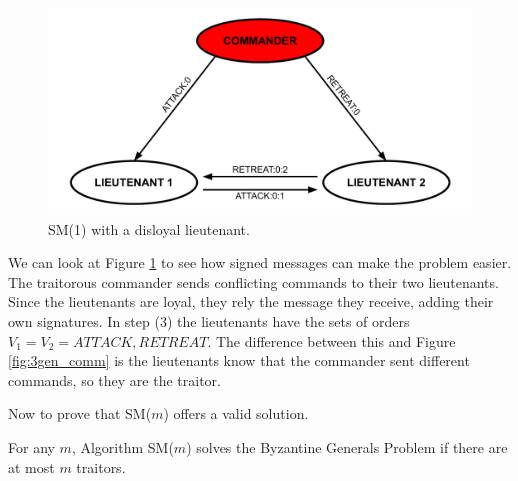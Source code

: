 \documentclass[10pt]{amsart}
\begin{document}
\begin{figure}[h!]
    \centering
    \includegraphics[scale=.55]{../figures/signed_messages_disloyal_commander.pdf}
    \caption{SM(1) with a disloyal lieutenant.}
    \label{fig:signed}
\end{figure}

We can look at Figure \ref{fig:signed} to see how signed messages can make the problem
easier. The traitorous commander sends conflicting commands to their two lieutenants. Since the lieutenants
are loyal, they rely the message they receive, adding their own signatures. In step (3) the lieutenants
have the sets of orders $V_1=V_2={ATTACK, RETREAT}$. The difference between this and Figure \ref{fig:3gen_comm}
is the lieutenants know that the commander sent different commands, so they are the traitor.

\pagebreak

Now to prove that SM($m$) offers a valid solution.

\begin{theorem}
    \label{theorem2}
    For any $m$, Algorithm SM($m$) solves the Byzantine Generals Problem if there are at most $m$
    traitors.
\end{theorem}
\end{document}
